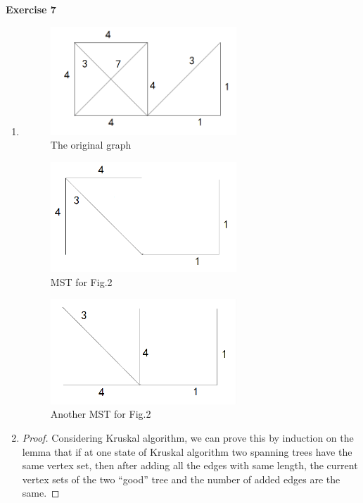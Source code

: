 \documentclass[12pt, notitlepage]{article}
\begin{document}
\vspace{1cm}
\textbf{Exercise 7}
\begin{enumerate}[1.]
\item \mbox{\quad}
\begin{figure}[H]\centering
\includegraphics[width=7cm]{7-1.png}\caption{The original graph}
\end{figure}
\begin{figure}[H]\centering
	\includegraphics[width=7cm]{7-2.png}\caption{MST for Fig.2}
\end{figure}
\begin{figure}[H]\centering
	\includegraphics[width=7cm]{7-3.png}\caption{Another MST for Fig.2}
\end{figure}
\item
\begin{proof}
Considering Kruskal algorithm, we can prove this by induction on the lemma that if at one state of Kruskal algorithm two spanning trees have the same vertex set, then after adding all the edges with same length, the current vertex sets of the two ``good'' tree and the number of added edges are the same.


\end{proof}
\end{enumerate}
\end{document}
